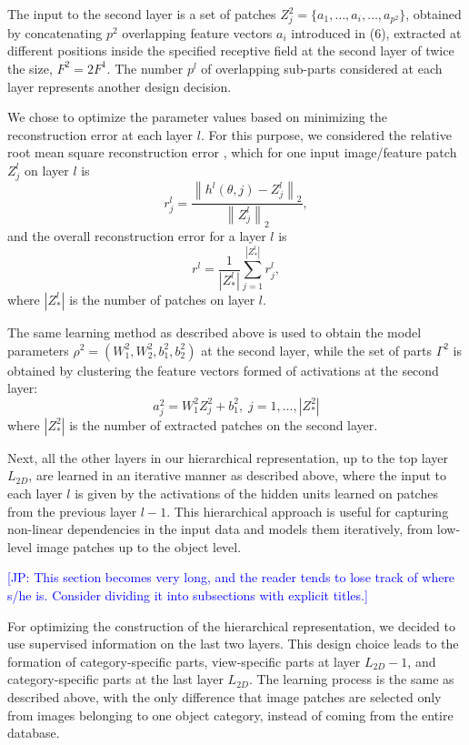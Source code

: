 \documentclass[runningheads]{llncs}
\newcommand{\commentJP}[1]{\textcolor{blue}{[JP: #1]}}
\begin{document}
The input to the second layer is a set of patches $Z_j^2=\{a_1,\ldots,a_i,\ldots,a_{p^2}\}$, obtained by concatenating  $p^2$ overlapping feature vectors $a_i$ introduced in (6), extracted at different positions inside the specified receptive field at the second layer of twice the size, $F^2=2F^1$. The number $p^l$ of overlapping sub-parts considered at each layer represents another design decision.

We chose to optimize the parameter values based on minimizing the reconstruction error at each layer $l$. For this purpose, we considered the relative root mean square reconstruction error \cite{Chai2014}, which for one input image/feature patch $Z_j^l$ on layer $l$ is
\begin{equation}
 r_j^l = \frac{\left\|h^l(\theta,j)-Z_j^l\right\|_2}{\left\|Z_j^l\right\|_2},
\end{equation}
and the overall reconstruction error for a layer $l$ is
\begin{equation}
  r^l = \frac{1}{|Z_*^l|} \sum_{j=1}^{|Z_*^l|} r_j^l,
  \label{eq:r}
\end{equation}
where $|Z_*^l|$ is the number of patches on layer $l$.

The same learning method as described above is used to obtain the model parameters $\rho^2=(W_1^2,W_2^2,b_1^2,b_2^2)$ at the second layer, while the set of parts $\Gamma^{2}$ is obtained by clustering the feature vectors formed of activations at the second layer:
\begin{equation}
a_j^2=W_1^2Z_j^2+b_1^2, \;j=1,\ldots,|Z_*^2|
\end{equation}
where $|Z_*^2|$ is the number of extracted patches on the second layer.

Next, all the other layers in our hierarchical representation, up to the top layer $L_{2D}$, are learned in an iterative manner as described above, where the input to each layer $l$ is given by the activations of the hidden units learned on patches from the previous layer $l-1$. This hierarchical approach is useful for capturing non-linear dependencies in the input data and models them iteratively, from low-level image patches up to the object level.

\commentJP{This section becomes very long, and the reader tends to lose track of where s/he is.  Consider dividing it into subsections with explicit titles.}

For optimizing the construction of the hierarchical representation, we decided to use supervised information on the last two layers. This design choice leads to the formation of category-specific parts, view-specific parts at layer $L_{2D}-1$, and category-specific parts at the last layer $L_{2D}$. The learning process is the same as described above, with the only difference that image patches are selected only from images belonging to one object category, instead of coming from the entire database.    
\end{document}

